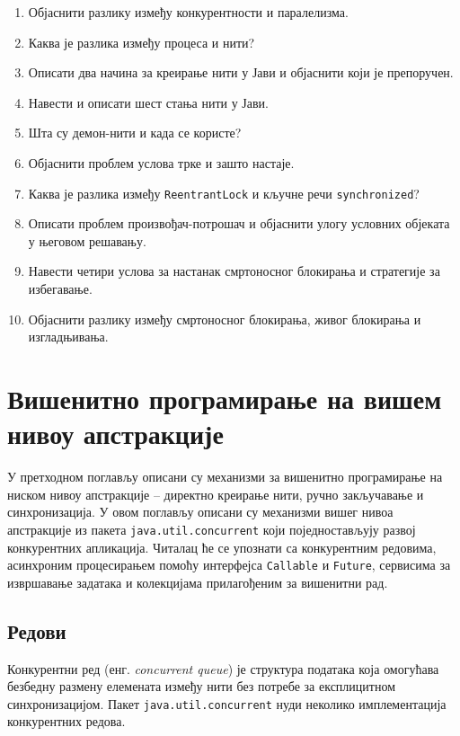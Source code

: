 \begin{enumerate}
\item Објаснити разлику између конкурентности и паралелизма.
\item Каква је разлика између процеса и нити?
\item Описати два начина за креирање нити у Јави и објаснити који је препоручен.
\item Навести и описати шест стања нити у Јави.
\item Шта су демон-нити и када се користе?
\item Објаснити проблем услова трке и зашто настаје.
\item Каква је разлика између \texttt{ReentrantLock} и кључне речи \texttt{synchronized}?
\item Описати проблем произвођач-потрошач и објаснити улогу условних објеката у његовом решавању.
\item Навести четири услова за настанак смртоносног блокирања и стратегије за избегавање.
\item Објаснити разлику између смртоносног блокирања, живог блокирања и изгладњивања.
\end{enumerate}



\setlength{\parindent}{15pt}
\setlength{\parskip}{0pt}
\chapter{Вишенитно програмирање на вишем нивоу апстракције}

У претходном поглављу описани су механизми за вишенитно програмирање на ниском нивоу апстракције – директно креирање нити, ручно закључавање и синхронизација. У овом поглављу описани су механизми вишег нивоа апстракције из пакета \texttt{java.util.concurrent} који поједностављују развој конкурентних апликација. Читалац ће се упознати са конкурентним редовима, асинхроним процесирањем помоћу интерфејса \texttt{Callable} и \texttt{Future}, сервисима за извршавање задатака и колекцијама прилагођеним за вишенитни рад.


\section{Редови}

Конкурентни ред (енг. \textit{concurrent queue}) је структура података која омогућава безбедну размену елемената између нити без потребе за експлицитном синхронизацијом. Пакет \texttt{java.util.concurrent} нуди неколико имплементација конкурентних редова.


